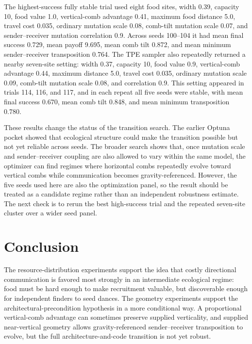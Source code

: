 \documentclass[11pt]{article}
\begin{document}
The highest-success fully stable trial used eight food sites, width 0.39,
capacity 10, food value 1.0, vertical-comb advantage 0.41, maximum food distance
5.0, travel cost 0.035, ordinary mutation scale 0.08, comb-tilt mutation scale
0.07, and sender--receiver mutation correlation 0.9. Across seeds 100--104 it
had mean final success 0.729, mean payoff 9.695, mean comb tilt 0.872, and mean
minimum sender--receiver transposition 0.764. The TPE sampler also repeatedly
returned a nearby seven-site setting: width 0.37, capacity 10, food value 0.9,
vertical-comb advantage 0.44, maximum distance 5.0, travel cost 0.035, ordinary
mutation scale 0.09, comb-tilt mutation scale 0.08, and correlation 0.9. This
setting appeared in trials 114, 116, and 117, and in each repeat all five seeds
were stable, with mean final success 0.670, mean comb tilt 0.848, and mean
minimum transposition 0.780.

These results change the status of the transition search. The earlier Optuna
pocket showed that ecological structure could make the transition possible but
not yet reliable across seeds. The broader search shows that, once mutation
scale and sender--receiver coupling are also allowed to vary within the same
model, the optimizer can find regimes where horizontal combs repeatedly evolve
toward vertical combs while communication becomes gravity-referenced. However,
the five seeds used here are also the optimization panel, so the result should
be treated as a candidate regime rather than an independent robustness estimate.
The next check is to rerun the best high-success trial and the repeated
seven-site cluster over a wider seed panel.

\section{Conclusion}

The resource-distribution experiments support the idea that costly directional
communication is favored most strongly in an intermediate ecological regime:
food must be hard enough to make recruitment valuable, but discoverable enough
for independent finders to seed dances. The geometry experiments support the
architectural-precondition hypothesis in a more conditional way. A
proportional vertical-comb advantage can sometimes preserve supplied
verticality, and supplied near-vertical geometry allows gravity-referenced
sender--receiver transposition to evolve, but the full architecture-and-code
transition is not yet robust.
\end{document}
